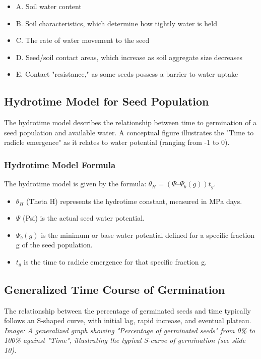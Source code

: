 \begin{itemize} 
    \item A. Soil water content 
    \item B. Soil characteristics, which determine how tightly water is held 
    \item C. The rate of water movement to the seed 
    \item D. Seed/soil contact areas, which increase as soil aggregate size decreases 
    \item E. Contact "resistance," as some seeds possess a barrier to water uptake 
\end{itemize}

\subsection{Hydrotime Model for Seed Population} 
The hydrotime model describes the relationship between time to germination of a seed population and available water. A conceptual figure illustrates the "Time to radicle emergence" as it relates to water potential (ranging from -1 to 0).

\subsubsection{Hydrotime Model Formula} 
The hydrotime model is given by the formula: $\theta_H = (\Psi – \Psi_b(g))t_g$. 

\begin{itemize} 
    \item $\theta_H$ (Theta H) represents the hydrotime constant, measured in MPa days. 
    \item $\Psi$ (Psi) is the actual seed water potential. 
    \item $\Psi_b(g)$ is the minimum or base water potential defined for a specific fraction g of the seed population. 
    \item $t_g$ is the time to radicle emergence for that specific fraction g. 
\end{itemize}

\subsection{Generalized Time Course of Germination} 
The relationship between the percentage of germinated seeds and time typically follows an S-shaped curve, with initial lag, rapid increase, and eventual plateau. \textit{Image: A generalized graph showing "Percentage of germinated seeds" from 0\% to 100\% against "Time", illustrating the typical S-curve of germination (see slide 10).}

